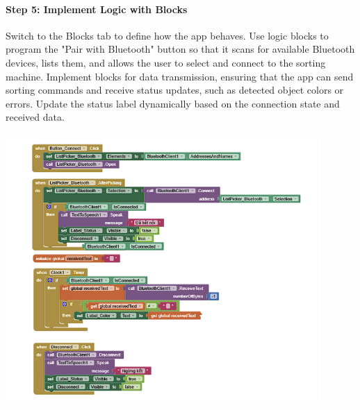\documentclass[conference, onecolumn]{IEEEtran}
\begin{document}
\paragraph{Step 5: Implement Logic with Blocks}  
Switch to the Blocks tab to define how the app behaves. Use logic blocks to program the "Pair with Bluetooth" button so that it scans for available Bluetooth devices, lists them, and allows the user to select and connect to the sorting machine. Implement blocks for data transmission, ensuring that the app can send sorting commands and receive status updates, such as detected object colors or errors. Update the status label dynamically based on the connection state and received data.

\begin{center}
    \includegraphics[width=0.9\textwidth]{Program the App with Blocks.png}
    \label{fig1}
    \end{center}
      \vspace{3em}
\noindent 
\end{document}
